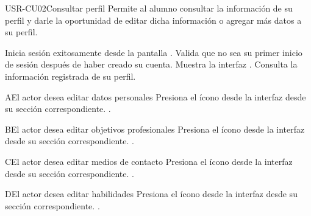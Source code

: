 \begin{UseCase}[]{USR-CU02}{Consultar perfil}{
	Permite al alumno consultar la información de su perfil y darle la oportunidad de editar dicha información o agregar más datos a su perfil.
}
\end{UseCase}

\begin{UCtrayectoria}
	\UCpaso [\UCactor] Inicia sesión exitosamente desde la pantalla .
    \UCpaso [\UCsist] Valida que no sea su primer inicio de sesión después de haber creado su cuenta.
	\UCpaso [\UCsist] Muestra la interfaz .
	\UCpaso [\UCactor] Consulta la información registrada de su perfil. 
\end{UCtrayectoria}

\begin{UCtrayectoriaA}{A}{El actor desea editar datos personales}
	\UCpaso [\UCsist] Presiona el ícono \IUEditar{} desde la interfaz  desde su sección correspondiente.
	.
\end{UCtrayectoriaA} 

\begin{UCtrayectoriaA}{B}{El actor desea editar objetivos profesionales}
	\UCpaso [\UCsist] Presiona el ícono \IUEditar{} desde la interfaz  desde su sección correspondiente.
	.
\end{UCtrayectoriaA} 

\begin{UCtrayectoriaA}{C}{El actor desea editar medios de contacto}
	\UCpaso [\UCsist] Presiona el ícono \IUEditar{} desde la interfaz  desde su sección correspondiente.
	.
\end{UCtrayectoriaA} 

\begin{UCtrayectoriaA}{D}{El actor desea editar habilidades}
	\UCpaso [\UCsist] Presiona el ícono \IUEditar{} desde la interfaz  desde su sección correspondiente.
	.
\end{UCtrayectoriaA} 


